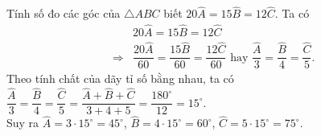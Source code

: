 \begin{vn}
	Tính số đo các góc của $\triangle ABC$ biết $20\widehat{A} = 15\widehat{B} = 12\widehat{C}$.
	\loigiai
	{
		Ta có 
		\begin{eqnarray*}
			&& 20\widehat{A} = 15\widehat{B} = 12\widehat{C}\\
			&\Rightarrow& \dfrac{20\widehat{A}}{60} = \dfrac{15\widehat{B}}{60} = \dfrac{12\widehat{C}}{60} \text{ hay } \dfrac{\widehat{A}}{3} = \dfrac{\widehat{B}}{4} = \dfrac{\widehat{C}}{5}.
		\end{eqnarray*}
		Theo tính chất của dãy tỉ số bằng nhau, ta có
		$\dfrac{\widehat{A}}{3} = \dfrac{\widehat{B}}{4} = \dfrac{\widehat{C}}{5} = \dfrac{\widehat{A} + \widehat{B} + \widehat{C}}{3+4+5} = \dfrac{180^\circ}{12} = 15^\circ$.\\
		Suy ra $\widehat{A} = 3 \cdot 15^\circ = 45^\circ$, $\widehat{B} = 4 \cdot 15^\circ = 60^\circ$, $\widehat{C} = 5 \cdot 15^\circ = 75^\circ$.
	}
\end{vn}

